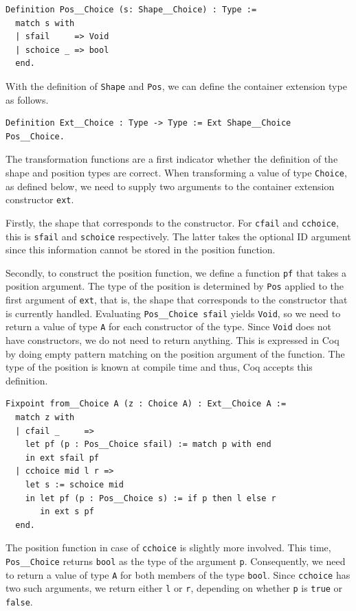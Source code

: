 \documentclass[a4paper, 11pt, fleqn, twoside]{scrreprt}
\newcommand{\cinl}[1]{\texttt{#1}}
\begin{document}
\begin{verbatim}
Definition Pos__Choice (s: Shape__Choice) : Type :=
  match s with
  | sfail     => Void
  | schoice _ => bool
  end.
\end{verbatim}

With the definition of \cinl{Shape} and \cinl{Pos}, we can define the container extension type as follows.

\begin{verbatim}
Definition Ext__Choice : Type -> Type := Ext Shape__Choice Pos__Choice.
\end{verbatim}

The transformation functions are a first indicator whether the definition of the shape and position types are correct.
When transforming a value of type \cinl{Choice}, as defined below, we need to supply two arguments to the container extension constructor \cinl{ext}.

Firstly, the shape that corresponds to the constructor.
For \cinl{cfail} and \cinl{cchoice}, this is \cinl{sfail} and \cinl{schoice} respectively.
The latter takes the optional ID argument since this information cannot be stored in the position function.

Secondly, to construct the position function, we define a function \cinl{pf} that takes a position argument.
The type of the position is determined by \cinl{Pos} applied to the first argument of \cinl{ext}, that is, the shape that corresponds to the constructor that is currently handled.
Evaluating \cinl{Pos__Choice sfail} yields \cinl{Void}, so we need to return a value of type \cinl{A} for each constructor of the type.
Since \cinl{Void} does not have constructors, we do not need to return anything.
This is expressed in Coq by doing empty pattern matching on the position argument of the function.
The type of the position is known at compile time and thus, Coq accepts this definition.

\begin{verbatim}
Fixpoint from__Choice A (z : Choice A) : Ext__Choice A :=
  match z with
  | cfail _     =>
    let pf (p : Pos__Choice sfail) := match p with end
    in ext sfail pf
  | cchoice mid l r =>
    let s := schoice mid
    in let pf (p : Pos__Choice s) := if p then l else r
       in ext s pf
  end.
\end{verbatim}

The position function in case of \cinl{cchoice} is slightly more involved.
This time, \cinl{Pos__Choice} returns \cinl{bool} as the type of the argument \cinl{p}.
Consequently, we need to return a value of type \cinl{A} for both members of the type \cinl{bool}.
Since \cinl{cchoice} has two such arguments, we return either \cinl{l} or \cinl{r}, depending on whether \cinl{p} is \cinl{true} or \cinl{false}.
\end{document}
